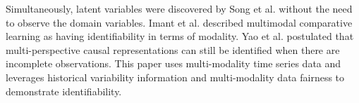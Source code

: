 Simultaneously, latent variables were discovered by Song et al. \cite{song2024temporally} without the need to observe the domain variables. Imant et al. \cite{daunhawer2023identifiability} described multimodal comparative learning as having identifiability in terms of modality. Yao et al.\cite{yao2023multi} postulated that multi-perspective causal representations can still be identified when there are incomplete observations. This paper uses multi-modality time series data and leverages historical variability information and multi-modality data fairness to demonstrate identifiability.


\clearpage
\appendix
